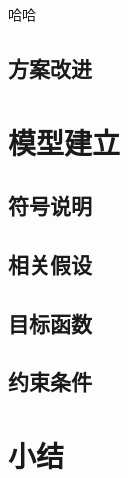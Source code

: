 哈哈
\subsection{方案改进}

\section{模型建立}
\subsection{符号说明}

\subsection{相关假设}

\subsection{目标函数}

\subsection{约束条件}


\section{小结}